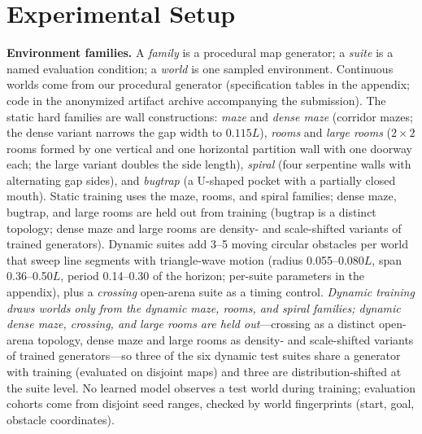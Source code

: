 \documentclass[letterpaper]{article} %
\begin{document}
\section{Experimental Setup}

\textbf{Environment families.} A \emph{family} is a procedural map generator; a \emph{suite} is a named evaluation condition; a \emph{world} is one sampled environment. Continuous worlds come from our procedural generator (specification tables in the appendix; code in the anonymized artifact archive accompanying the submission). The static hard families are wall constructions: \emph{maze} and \emph{dense maze} (corridor mazes; the dense variant narrows the gap width to $0.115L$), \emph{rooms} and \emph{large rooms} ($2{\times}2$ rooms formed by one vertical and one horizontal partition wall with one doorway each; the large variant doubles the side length), \emph{spiral} (four serpentine walls with alternating gap sides), and \emph{bugtrap} (a U-shaped pocket with a partially closed mouth). Static training uses the maze, rooms, and spiral families; dense maze, bugtrap, and large rooms are held out from training (bugtrap is a distinct topology; dense maze and large rooms are density- and scale-shifted variants of trained generators). Dynamic suites add 3--5 moving circular obstacles per world that sweep line segments with triangle-wave motion (radius 0.055--0.080$L$, span 0.36--0.50$L$, period 0.14--0.30 of the horizon; per-suite parameters in the appendix), plus a \emph{crossing} open-arena suite as a timing control. \emph{Dynamic training draws worlds only from the dynamic maze, rooms, and spiral families; dynamic dense maze, crossing, and large rooms are held out}---crossing as a distinct open-arena topology, dense maze and large rooms as density- and scale-shifted variants of trained generators---so three of the six dynamic test suites share a generator with training (evaluated on disjoint maps) and three are distribution-shifted at the suite level. No learned model observes a test world during training; evaluation cohorts come from disjoint seed ranges, checked by world fingerprints (start, goal, obstacle coordinates).
\end{document}
